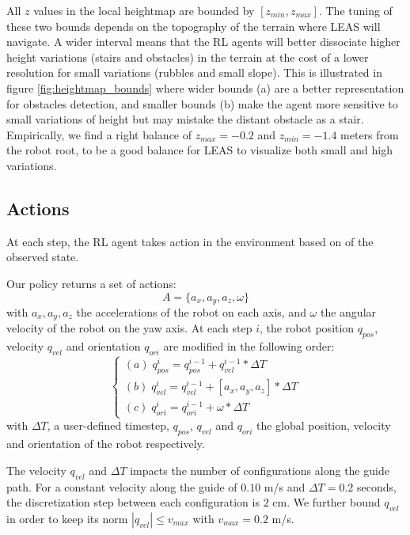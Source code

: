 All $z$ values in the local heightmap are bounded by $[z_{min}, z_{max}]$. The tuning of these two bounds depends on the topography of the terrain where LEAS will navigate. 
A wider interval means that the RL agents will better dissociate higher height variations (stairs and obstacles) in the terrain at the cost of a lower resolution for small variations (rubbles and small slope).
This is illustrated in figure \ref{fig:heightmap_bounds} where wider bounds (a) are a better representation for obstacles detection, and smaller bounds (b) make the agent more sensitive to small variations of height but may mistake the distant obstacle as a stair. 
Empirically, we find a right balance of $z_{max}= -0.2$ and $z_{min}= -1.4$ meters from the robot root, to be a good balance for LEAS to visualize both small and high variations.

\subsection{Actions\label{subsubsec:actions}}
At each step, the RL agent takes action in the environment based on of the observed state. 

Our policy returns a set of actions: 
\begin{equation}
A = \{ a_x, a_y, a_z, \omega \}
\end{equation}
with $a_x, a_y, a_z$ the accelerations of the robot on each axis, and $\omega$ the angular velocity of the robot on the yaw axis. At each step $i$, the robot position $q_{pos}$, velocity $q_{vel}$ and orientation $q_{ori}$ are modified in the following order:
\begin{equation}
\begin{cases}
(a) \; q_{pos}^i = q_{pos}^{i-1} + q_{vel}^{i-1} * \Delta T \\

(b) \; q_{vel}^i = q_{vel}^{i-1} + [a_x, a_y, a_z] * \Delta T \\

(c) \; q_{ori}^i = q_{ori}^{i-1} + \omega * \Delta T 
\end{cases}
\end{equation}
with $\Delta T$, a user-defined timestep, $q_{pos}$, $q_{vel}$ and $q_{ori}$ the global position, velocity and orientation of the robot respectively.

The velocity $q_{vel}$ and $\Delta T$ impacts the number of configurations along the guide path. For a constant velocity along the guide of $0.10$ m/s and $\Delta T=0.2$ seconds, the discretization step between each configuration is $2$ cm. 
We further bound $q_{vel}$ in order to keep its norm $|q_{vel}| \leq v_{max}$ with $v_{max}=0.2$ m/s. %

